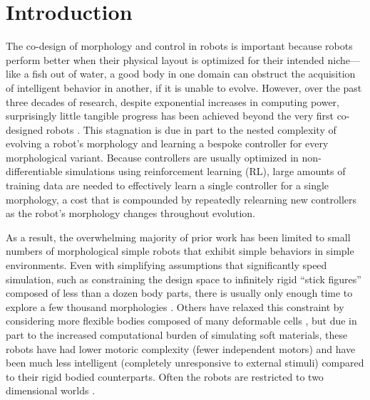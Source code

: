 \section{Introduction}
\label{sec:intro}


The co-design of morphology and control in robots is
important because robots perform better when their physical layout is optimized for their intended niche---%
like a fish out of water, a good body in one domain can obstruct the acquisition of intelligent behavior in another, if it is unable to evolve.
However, over the past three decades of research, despite exponential increases in computing power, surprisingly little tangible progress has been achieved beyond the very first co-designed robots \cite{sims1994competition}.
This stagnation is due in part to the nested complexity of evolving a robot’s morphology and learning a bespoke controller for every morphological variant.
Because controllers are usually optimized in non-differentiable  simulations using reinforcement learning (RL), large amounts of training data are needed to effectively learn a single controller for a single morphology, a cost that is compounded by repeatedly relearning new controllers as the robot's morphology changes throughout evolution.


As a result, the overwhelming majority of prior work 
has been limited to 
small numbers of
morphological simple robots 
that exhibit simple behaviors 
in simple environments.
Even with simplifying assumptions that significantly speed simulation,
such as constraining the design space to infinitely
rigid ``stick figures'' composed of less than a dozen body parts,
there is usually only enough time to explore a few thousand morphologies 
\cite{zhao2020robogrammar,gupta2021embodied,yuan2022transformact}.
Others have relaxed this constraint by considering more flexible bodies composed of many deformable cells \cite{cheney2018scalable,kriegman2020xenobots,li2025generating}, but due in part to the increased computational burden of simulating soft materials, these robots have had lower motoric complexity (fewer independent motors)
and have been much less intelligent (completely unresponsive to external stimuli) 
compared to their rigid bodied counterparts.
Often the robots are restricted to two dimensional worlds \mbox{\cite{medvet2021biodiversity,wang2023preco,strgar2024evolution}.}


